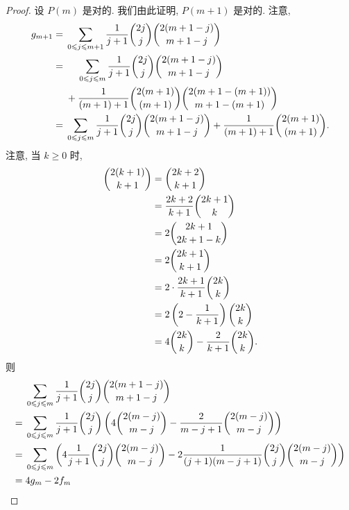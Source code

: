 \documentclass[../libro.tex]{subfiles}
\begin{document}
\begin{proof}
    设 \(P(m)\) 是对的.
    我们由此证明, \(P(m+1)\) 是对的.
    注意,
    \begin{align*}
        g_{m+1}
        = {} &
        \sum_{0 \leq j \leq m+1} {
            \frac{1}{j+1} \dbinom{2j}{j} \dbinom{2(m+1-j)}{m+1-j}
        }
        \\
        = {} &
        \hphantom{{} + {}}
        \sum_{0 \leq j \leq m} {
            \frac{1}{j+1} \dbinom{2j}{j} \dbinom{2(m+1-j)}{m+1-j}
        }
        \\
        &
        {} + \frac{1}{(m+1)+1} \dbinom{2(m+1)}{(m+1)}
        \dbinom{2(m+1-(m+1))}{m+1-(m+1)}
        \\
        = {} &
        \sum_{0 \leq j \leq m} {
            \frac{1}{j+1} \dbinom{2j}{j} \dbinom{2(m+1-j)}{m+1-j}
        }
        + \frac{1}{(m+1)+1} \dbinom{2(m+1)}{(m+1)}.
    \end{align*}
    注意, 当 \(k \geq 0\) 时,
    \begin{align*}
        \dbinom{2(k+1)}{k+1}
        = {} &
        \dbinom{2k+2}{k+1}
        \\
        = {} &
        \frac{2k+2}{k+1} \dbinom{2k+1}{k}
        \\
        = {} &
        2 \dbinom{2k+1}{2k+1-k}
        \\
        = {} &
        2 \dbinom{2k+1}{k+1}
        \\
        = {} &
        2 \cdot \frac{2k+1}{k+1} \dbinom{2k}{k}
        \\
        = {} &
        2 \left(2 - \frac{1}{k+1}\right) \dbinom{2k}{k}
        \\
        = {} &
        4 \dbinom{2k}{k} - \frac{2}{k+1} \dbinom{2k}{k}.
    \end{align*}
    则
    \begin{align*}
        &
        \sum_{0 \leq j \leq m} {
            \frac{1}{j+1} \dbinom{2j}{j} \dbinom{2(m+1-j)}{m+1-j}
        }
        \\
        = {} &
        \sum_{0 \leq j \leq m} {
            \frac{1}{j+1} \dbinom{2j}{j}
            \left( 4 \dbinom{2(m-j)}{m-j} - \frac{2}{m-j+1} \dbinom{2(m-j)}{m-j} \right)
        }
        \\
        = {} &
        \sum_{0 \leq j \leq m} {
            \left(
                4 \frac{1}{j+1} \dbinom{2j}{j} \dbinom{2(m-j)}{m-j}
                - 2 \frac{1}{(j+1)(m-j+1)} \dbinom{2j}{j} \dbinom{2(m-j)}{m-j}
            \right)
        }
        \\
        = {} &
        4 g_m - 2 f_m
        \\

\end{align*}
\end{proof}
\end{document}
